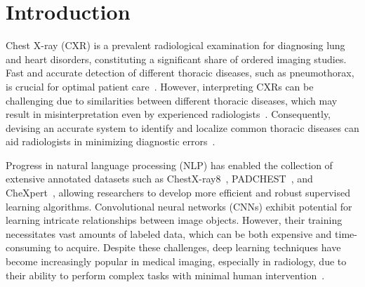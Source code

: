 \documentclass[review,1p,times,numbers]{elsarticle}
\begin{document}
\begin{frontmatter}


\end{frontmatter}

\section{Introduction}\label{sec:taxonomy.introduction}
Chest X-ray (CXR) is a prevalent radiological examination for diagnosing lung and heart disorders, constituting a significant share of ordered imaging studies. Fast and accurate detection of different thoracic diseases, such as pneumothorax, is crucial for optimal patient care~\cite{bellaviti_Increased_2016}. However, interpreting CXRs can be challenging due to similarities between different thoracic diseases, which may result in misinterpretation even by experienced radiologists~\cite{delrue_Difficulties_2011}. Consequently, devising an accurate system to identify and localize common thoracic diseases can aid radiologists in minimizing diagnostic errors~\cite{crisp_Global_2014,silverstein_Most_2016}.

Progress in natural language processing (NLP) has enabled the collection of extensive annotated datasets such as ChestX-ray8~\cite{wang_ChestXRay8_2017}, PADCHEST~\cite{bustos_Padchest_2020}, and CheXpert~\cite{irvin_CheXpert_2019}, allowing researchers to develop more efficient and robust supervised learning algorithms. Convolutional neural networks (CNNs) exhibit potential for learning intricate relationships between image objects. However, their training necessitates vast amounts of labeled data, which can be both expensive and time-consuming to acquire. Despite these challenges, deep learning techniques have become increasingly popular in medical imaging, especially in radiology, due to their ability to perform complex tasks with minimal human intervention~\cite{jaderberg_Spatial_2015}.
\end{document}
